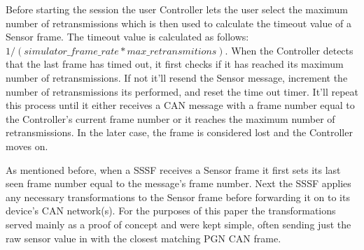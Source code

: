 \documentclass[letterpaper,twocolumn,12pt]{article}
\begin{document}
Before starting the session the user Controller lets the user select the maximum number of retransmissions which is then used to calculate the timeout value of a Sensor frame. The timeout value is calculated as follows: $1/(simulator\_frame\_rate * max\_retransmitions)$. When the Controller detects that the last frame has timed out, it first checks if it has reached its maximum number of retransmissions. If not it'll resend the Sensor message, increment the number of retransmissions its performed, and reset the time out timer. It’ll repeat this process until it either receives a CAN message with a frame number equal to the Controller's current frame number or it reaches the maximum number of retransmissions. In the later case, the frame is considered lost and the Controller moves on.

As mentioned before, when a SSSF receives a Sensor frame it first sets its last seen frame number equal to the message's frame number. Next the SSSF applies any necessary transformations to the Sensor frame before forwarding it on to its device's CAN network(s). For the purposes of this paper the transformations served mainly as a proof of concept and were kept simple, often sending just the raw sensor value in with the closest matching PGN CAN frame.
\end{document}
